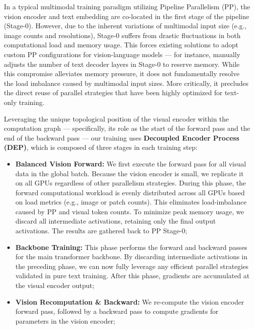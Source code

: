\documentclass{article}
\begin{document}
In a typical multimodal training paradigm utilizing Pipeline Parallelism (PP), the vision encoder and text embedding are co-located in the first stage of the pipeline (Stage-0). However, due to the inherent variations of multimodal input size (e.g., image counts and resolutions), Stage-0 suffers from drastic fluctuations in both computational load and memory usage. This forces existing solutions to adopt custom PP configurations for vision-language models --- for instance, \cite{team2025kimivl} manually adjusts the number of text decoder layers in Stage-0 to reserve memory. While this compromise alleviates memory pressure, it does not fundamentally resolve the load imbalance caused by multimodal input sizes. More critically, it precludes the direct reuse of parallel strategies that have been highly optimized for text-only training.

Leveraging the unique topological position of the visual encoder within the computation graph --- specifically, its role as the start of the forward pass and the end of the backward pass --- our training uses \textbf{Decoupled Encoder Process (DEP)}, which is composed of three stages in each training step:

\begin{itemize}
\item \textbf{Balanced Vision Forward:} We first execute the forward pass for all visual data in the global batch. Because the vision encoder is small, we replicate it on all GPUs regardless of other parallelism strategies. During this phase, the forward computational workload is evenly distributed across all GPUs based on load metrics (e.g., image or patch counts). This eliminates load-imbalance caused by PP and visual token counts. To minimize peak memory usage, we discard all intermediate activations, retaining only the final output activations. The results are gathered back to PP Stage-0;

\item \textbf{Backbone Training:} This phase performs the forward and backward passes for the main transformer backbone. By discarding intermediate activations in the preceding phase, we can now fully leverage any efficient parallel strategies validated in pure text training. After this phase, gradients are accumulated at the visual encoder output;
\item \textbf{Vision Recomputation \& Backward:} We re-compute the vision encoder forward pass, followed by a backward pass to compute gradients for parameters in the vision encoder;
\end{itemize}
\end{document}
